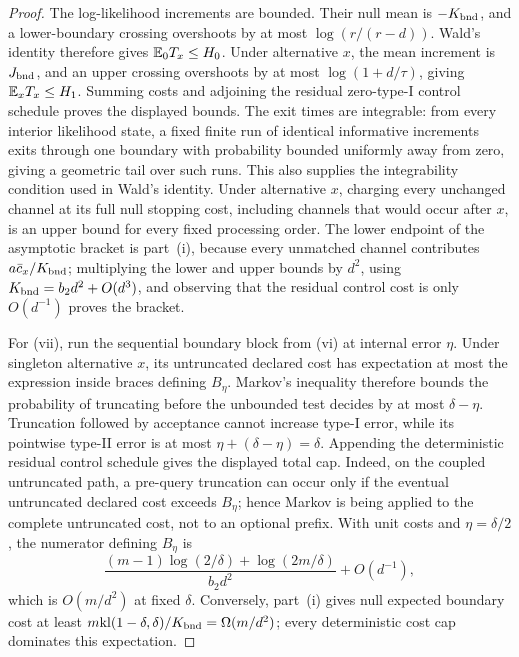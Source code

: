 \begin{proof}
The log-likelihood increments are bounded.  Their null mean is
\(-K_{\rm bnd}\), and a lower-boundary crossing overshoots by at most
\(\log(r/(r-d))\).  Wald's identity therefore gives
\(\mathbb{E}_0T_x\le H_0\).  Under alternative \(x\), the mean increment is
\(J_{\rm bnd}\), and an upper crossing overshoots by at most
\(\log(1+d/\tau)\), giving \(\mathbb{E}_xT_x\le H_1\).  Summing costs and adjoining
the residual zero-type-I control schedule proves the displayed bounds.  The
exit times are integrable: from every interior likelihood state, a fixed
finite run of identical informative increments exits through one boundary
with probability bounded uniformly away from zero, giving a geometric tail
over such runs.  This also supplies the integrability condition used in
Wald's identity.  Under alternative \(x\), charging every unchanged channel
at its full null stopping cost, including channels that would occur after
\(x\), is an upper bound for every fixed processing order.  The
lower endpoint of the asymptotic bracket is part~(i), because every unmatched
channel contributes \(a\bar c_x/K_{\rm bnd}\); multiplying the lower and upper
bounds by \(d^2\), using \(K_{\rm bnd}=b_2d^2+O(d^3)\), and observing that the
residual control cost is only \(O(d^{-1})\) proves the bracket.

For (vii), run the sequential boundary block from (vi) at internal error
\(\eta\).  Under singleton alternative \(x\), its untruncated declared cost
has expectation at most the expression inside braces defining \(B_\eta\).
Markov's inequality therefore bounds the probability of truncating before the
unbounded test decides by at most \(\delta-\eta\).  Truncation followed by
acceptance cannot increase type-I error, while its pointwise type-II error is
at most \(\eta+(\delta-\eta)=\delta\).  Appending the deterministic residual
control schedule gives the displayed total cap.  Indeed, on the coupled
untruncated path, a pre-query truncation can occur only if the eventual
untruncated declared cost exceeds \(B_\eta\); hence Markov is being applied to
the complete untruncated cost, not to an optional prefix.  With unit costs and
\(\eta=\delta/2\), the numerator defining \(B_\eta\) is
\[
\frac{(m-1)\log(2/\delta)+\log(2m/\delta)}{b_2d^2}
+O(d^{-1}),
\]
which is \(O(m/d^2)\) at fixed \(\delta\).  Conversely, part~(i) gives null
expected boundary cost at least
\(m\mathrm{kl}(1-\delta,\delta)/K_{\rm bnd}=\Omega(m/d^2)\); every deterministic cost
cap dominates this expectation.
\end{proof}

